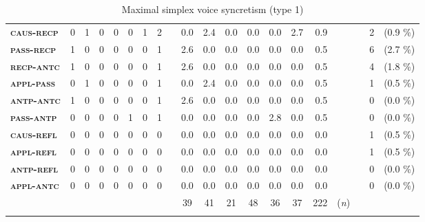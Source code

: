 \begin{sidewaystable}
\begin{tabularx}{\textwidth}{lrrrrrrrlrrrrrrrlrrr}
		\textbf{\textsc{caus-recp}} & 0 & 1 & 0 & 0 & 0 & 1 & 2 & & 0.0 & 2.4 & 0.0 & 0.0 & 0.0 & 2.7 & 0.9 & & & 2 & (0.9 \%) \\
		\textbf{\textsc{pass-recp}} & 1 & 0 & 0 & 0 & 0 & 0 & 1 & & 2.6 & 0.0 & 0.0 & 0.0 & 0.0 & 0.0 & 0.5 & & & 6 & (2.7 \%) \\
		\textbf{\textsc{recp-antc}} & 1 & 0 & 0 & 0 & 0 & 0 & 1 & & 2.6 & 0.0 & 0.0 & 0.0 & 0.0 & 0.0 & 0.5 & & & 4 & (1.8 \%) \\
		\textbf{\textsc{appl-pass}} & 0 & 1 & 0 & 0 & 0 & 0 & 1 & & 0.0 & 2.4 & 0.0 & 0.0 & 0.0 & 0.0 & 0.5 & & & 1 & (0.5 \%) \\
		\textbf{\textsc{antp-antc}} & 1 & 0 & 0 & 0 & 0 & 0 & 1 & & 2.6 & 0.0 & 0.0 & 0.0 & 0.0 & 0.0 & 0.5 & & & 0 & (0.0 \%) \\
		\textbf{\textsc{pass-antp}} & 0 & 0 & 0 & 0 & 1 & 0 & 1 & & 0.0 & 0.0 & 0.0 & 0.0 & 2.8 & 0.0 & 0.5 & & & 0 & (0.0 \%) \\
		\textbf{\textsc{caus-refl}} & 0 & 0 & 0 & 0 & 0 & 0 & 0 & & 0.0 & 0.0 & 0.0 & 0.0 & 0.0 & 0.0 & 0.0 & & & 1 & (0.5 \%) \\
		\textbf{\textsc{appl-refl}} & 0 & 0 & 0 & 0 & 0 & 0 & 0 & & 0.0 & 0.0 & 0.0 & 0.0 & 0.0 & 0.0 & 0.0 & & & 1 & (0.5 \%) \\
		\textbf{\textsc{antp-refl}} & 0 & 0 & 0 & 0 & 0 & 0 & 0 & & 0.0 & 0.0 & 0.0 & 0.0 & 0.0 & 0.0 & 0.0 & & & 0 & (0.0 \%) \\
		\textbf{\textsc{appl-antc}} & 0 & 0 & 0 & 0 & 0 & 0 & 0 & & 0.0 & 0.0 & 0.0 & 0.0 & 0.0 & 0.0 & 0.0 & & & 0 & (0.0 \%) \\
		\midrule
		& & & & & & & & & \multicolumn{1}{c}{39} & \multicolumn{1}{c}{41} & \multicolumn{1}{c}{21} & \multicolumn{1}{c}{48} & \multicolumn{1}{c}{36} & \multicolumn{1}{c}{37} & \multicolumn{1}{c}{222} & (\textit{n}) & & & \\
		\lspbottomrule
	\end{tabularx}
	\caption{Maximal simplex voice syncretism (type 1)}
	\label{tab:ch6:voice-syncretism-maximal-simplex-macroarea}
\end{sidewaystable} 

